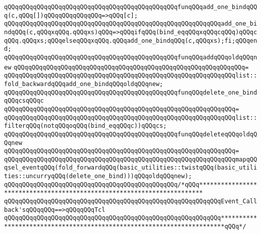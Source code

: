 \newline
\newline
\verb|qQQqqQQqqQQqqQQqqQQqqQQqqQQqqQQqqQQqqQQqqQQqqQQqfunqQQqadd_one_bindqQQq(c,qQQq[])qQQqqQQqqQQqqQQq=>qQQq[c];|\newline
\verb|qQQqqQQqqQQqqQQqqQQqqQQqqQQqqQQqqQQqqQQqqQQqqQQqqQQqqQQqqQQqadd_one_bindqQQq(c,qQQqxqQQq.qQQqxs)qQQq=>qQQqifqQQq(bind_eqqQQqxqQQqcqQQq)qQQqcqQQq.qQQqxs;qQQqelseqQQqxqQQq.qQQqadd_one_bindqQQq(c,qQQqxs);fi;qQQqend;|\newline
\newline
\verb|qQQqqQQqqQQqqQQqqQQqqQQqqQQqqQQqqQQqqQQqqQQqqQQqfunqQQqaddqQQqoldqQQqnew|\newline
\verb|qQQqqQQqqQQqqQQqqQQqqQQqqQQqqQQqqQQqqQQqqQQqqQQqqQQqqQQqqQQqqQQq=|\newline
\verb|qQQqqQQqqQQqqQQqqQQqqQQqqQQqqQQqqQQqqQQqqQQqqQQqqQQqqQQqqQQqqQQqlist::fold_backwardqQQqadd_one_bindqQQqoldqQQqnew;|\newline
\newline
\verb|qQQqqQQqqQQqqQQqqQQqqQQqqQQqqQQqqQQqqQQqqQQqqQQqfunqQQqdelete_one_bindqQQqcsqQQqc|\newline
\verb|qQQqqQQqqQQqqQQqqQQqqQQqqQQqqQQqqQQqqQQqqQQqqQQqqQQqqQQqqQQqqQQq=|\newline
\verb|qQQqqQQqqQQqqQQqqQQqqQQqqQQqqQQqqQQqqQQqqQQqqQQqqQQqqQQqqQQqqQQqlist::filterqQQq(notqQQqoqQQq(bind_eqqQQqc))qQQqcs;|\newline
\newline
\verb|qQQqqQQqqQQqqQQqqQQqqQQqqQQqqQQqqQQqqQQqqQQqqQQqfunqQQqdeleteqQQqoldqQQqnew|\newline
\verb|qQQqqQQqqQQqqQQqqQQqqQQqqQQqqQQqqQQqqQQqqQQqqQQqqQQqqQQqqQQqqQQq=|\newline
\verb|qQQqqQQqqQQqqQQqqQQqqQQqqQQqqQQqqQQqqQQqqQQqqQQqqQQqqQQqqQQqqQQqmapqQQqsel_eventqQQq(fold_forwardqQQq(basic_utilities::twistqQQq(basic_utilities::uncurryqQQq(delete_one_bind)))qQQqoldqQQqnew);|\newline
\newline
\newline
\verb|qQQqqQQqqQQqqQQqqQQqqQQqqQQqqQQqqQQqqQQqqQQqqQQq/*qQQq***********************************************************************|\newline
\newline
\verb|qQQqqQQqqQQqqQQqqQQqqQQqqQQqqQQqqQQqqQQqqQQqqQQqqQQqqQQqqQQqEvent_Callback'sqQQqqQQq==>qQQqqQQqTcl|\newline
\newline
\verb|qQQqqQQqqQQqqQQqqQQqqQQqqQQqqQQqqQQqqQQqqQQqqQQqqQQqqQQqqQQq***********************************************************************qQQq*/|\newline
